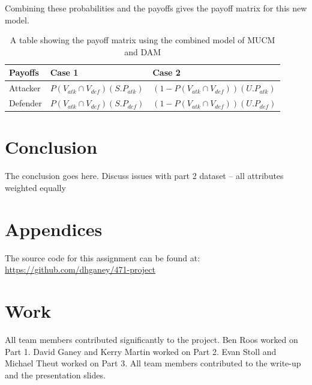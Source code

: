\documentclass[11pt,journal]{IEEEtran}
\begin{document}
Combining these probabilities and the payoffs gives the payoff matrix for this new model.
 \begin{table}[H]
{\renewcommand{\arraystretch}{1.2}%
\begin{tabular}{ |l |l | l | }
\hline
Payoffs & Case 1  & Case 2  \\ \hline
Attacker & $P(V_{atk}\cap V_{def})(S.P_{atk})$ & $(1-P(V_{atk}\cap V_{def}))(U.P_{atk})$    \\ \hline
 Defender  & $P(V_{atk}\cap V_{def})(S.P_{def})$ & $(1-P(V_{atk}\cap V_{def}))(U.P_{def})$  \\ \hline

\end{tabular}} \quad
\caption{A table showing the payoff matrix using the combined model of MUCM and DAM} 
\end{table}


\section{Conclusion} \label{conclusion}
The conclusion goes here.
Discuss issues with part 2 dataset -- all attributes weighted equally


\section*{Appendices}

The source code for this assignment can be found at:
\url{https://github.com/dhganey/471-project}


\section*{Work}
All team members contributed significantly to the project. Ben Roos worked on Part 1. David Ganey and Kerry Martin worked on Part 2. Evan Stoll and Michael Theut worked on Part 3. All team members contributed to the write-up and the presentation slides.





\end{document}
